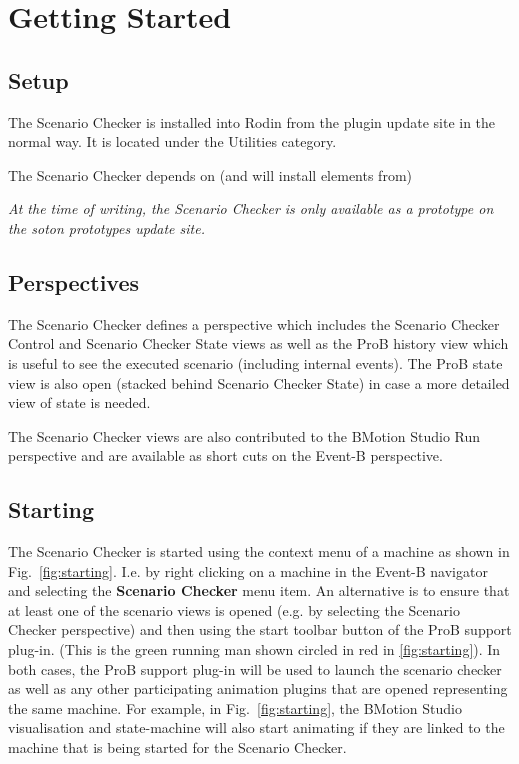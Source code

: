 \section{Getting Started}
\label{sec:getting-started}

\subsection{Setup}
\label{sec:setup}

The Scenario Checker is installed into Rodin from the plugin update site in the normal way.
It is located under the Utilities category.

The Scenario Checker depends on (and will install elements from)

\emph{At the time of writing, the Scenario Checker is only available as a prototype on the soton prototypes update site.}

\subsection{Perspectives}
\label{sec:perspectives}

The Scenario Checker defines a perspective which includes the Scenario Checker Control and Scenario Checker State views as well as the ProB history view which is useful to see the executed scenario (including internal events). 
The ProB state view is also open (stacked behind Scenario Checker State) in case a more detailed view of state is needed.

The Scenario Checker views are also contributed to the BMotion Studio Run perspective and are available as short cuts on the Event-B perspective.

\subsection{Starting}
\label{sec:starting}

The Scenario Checker is started using the context menu of a machine as shown in Fig.~\ref{fig:starting}.
I.e. by right clicking on a machine in the Event-B navigator and selecting the \textbf{Scenario Checker} menu item.
An alternative is to ensure that at least one of the scenario views is opened (e.g. by selecting the Scenario Checker perspective) and then using the start toolbar button of the ProB support plug-in. 
(This is the green running man shown circled in red in \ref{fig:starting}).
In both cases, the ProB support plug-in will be used to launch the scenario checker as well as any other participating animation plugins that are opened representing the same machine.
For example, in Fig.~\ref{fig:starting}, the BMotion Studio visualisation and state-machine will also start animating if they are linked to the machine that is being started for the Scenario Checker.

